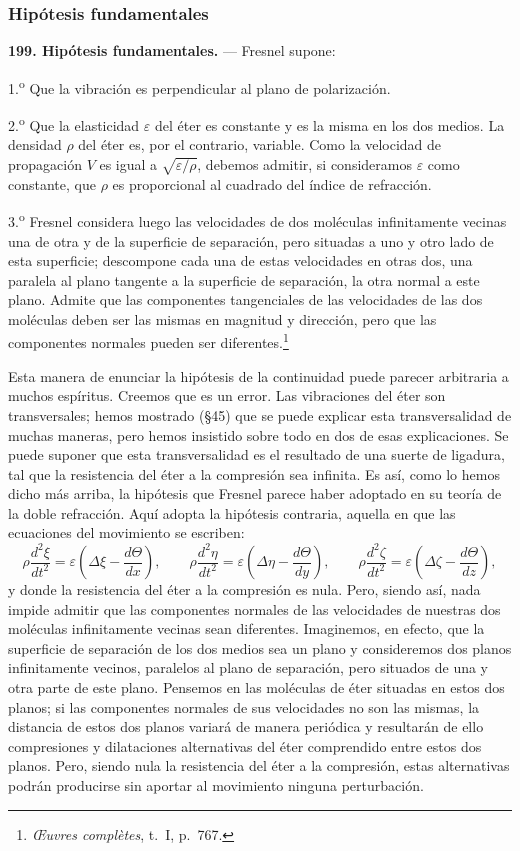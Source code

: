 \subsubsection{Hipótesis fundamentales}

\noindent\textbf{199. Hipótesis fundamentales.} — Fresnel supone:

1.\textsuperscript{o} Que la vibración es perpendicular al plano de polarización.

2.\textsuperscript{o} Que la elasticidad $\varepsilon$ del éter es constante y es la
misma en los dos medios. La densidad $\rho$ del éter es, por el contrario,
variable. Como la velocidad de propagación $V$ es igual a
$\sqrt{\varepsilon/\rho}$, debemos admitir, si consideramos $\varepsilon$
como constante, que $\rho$ es proporcional al cuadrado del índice de
refracción.

3.\textsuperscript{o} Fresnel considera luego las velocidades de dos moléculas
infinitamente vecinas una de otra y de la superficie de separación, pero
situadas a uno y otro lado de esta superficie; descompone cada una de
estas velocidades en otras dos, una paralela al plano tangente a la
superficie de separación, la otra normal a este plano. Admite que las
componentes tangenciales de las velocidades de las dos moléculas deben ser
las mismas en magnitud y dirección, pero que las componentes normales
pueden ser diferentes.\footnote{\emph{Œuvres complètes}, t.~I, p.~767.}

Esta manera de enunciar la hipótesis de la continuidad puede parecer
arbitraria a muchos espíritus. Creemos que es un error. Las vibraciones
del éter son transversales; hemos mostrado (§45) que se puede explicar
esta transversalidad de muchas maneras, pero hemos insistido sobre todo en
dos de esas explicaciones. Se puede suponer que esta transversalidad es el
resultado de una suerte de ligadura, tal que la resistencia del éter a la
compresión sea infinita. Es así, como lo hemos dicho más arriba, la
hipótesis que Fresnel parece haber adoptado en su teoría de la doble
refracción. Aquí adopta la hipótesis contraria, aquella en que las
ecuaciones del movimiento se escriben:
\[
\rho\frac{d^2\xi}{dt^2}=\varepsilon\left(\Delta\xi-\frac{d\Theta}{dx}\right),
\qquad
\rho\frac{d^2\eta}{dt^2}=\varepsilon\left(\Delta\eta-\frac{d\Theta}{dy}\right),
\qquad
\rho\frac{d^2\zeta}{dt^2}=\varepsilon\left(\Delta\zeta-\frac{d\Theta}{dz}\right),
\]
y donde la resistencia del éter a la compresión es nula. Pero, siendo así,
nada impide admitir que las componentes normales de las velocidades de
nuestras dos moléculas infinitamente vecinas sean diferentes. Imaginemos,
en efecto, que la superficie de separación de los dos medios sea un plano
y consideremos dos planos infinitamente vecinos, paralelos al plano de
separación, pero situados de una y otra parte de este plano. Pensemos en
las moléculas de éter situadas en estos dos planos; si las componentes
normales de sus velocidades no son las mismas, la distancia de estos dos
planos variará de manera periódica y resultarán de ello compresiones y
dilataciones alternativas del éter comprendido entre estos dos planos.
Pero, siendo nula la resistencia del éter a la compresión, estas
alternativas podrán producirse sin aportar al movimiento ninguna
perturbación.

